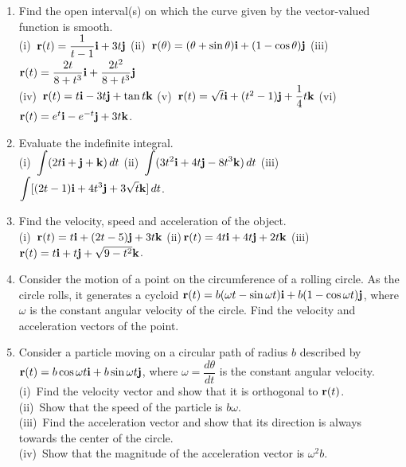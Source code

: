 \documentclass[titlepage,a4paper,12pt]{report}
\begin{document}
\begin{enumerate}
\quad (i)\,$D_t[{\bf{r}}(t)\pm {\bf{u}}(t)]={\bf{r}}'(t) \pm {\bf{u}}'(t)$, \quad (ii)\,$D_t[{\bf{r}}(t)\cdot {\bf{u}}(t)]={\bf{r}}(t) \cdot {\bf{u}}'(t)+{\bf{r}}'(t)\cdot {\bf{u}}(t)$, \\
\quad (iii)\, If ${\bf{r}}(t)\cdot {\bf{r}}(t)=c$, then ${\bf{r}}(t)\cdot {\bf{r}}'(t)=0$.
\item Find the open interval(s) on which the curve given by the vector-valued function is smooth.\\
(i)\, ${\bf{r}}(t)=\dfrac{1}{t-1}{\bf{i}}+3t{\bf{j}}$ \quad (ii)\, ${\bf{r}}(\theta)=(\theta +\sin \theta){\bf{i}}+(1-\cos \theta){\bf{j}}$ \quad (iii)\, ${\bf{r}}(t)=\dfrac{2t}{8+t^3}{\bf{i}}+\dfrac{2t^2}{8+t^3}{\bf{j}}$\\
(iv)\, ${\bf{r}}(t)=t{\bf{i}}-3t{\bf{j}}+\tan t {\bf{k}}$ \quad (v)\, ${\bf{r}}(t)=\sqrt{t}{{\bf{i}}}+(t^2-1){\bf{j}}+\dfrac{1}{4}t{\bf{k}}$ \quad (vi)\, ${\bf{r}}(t)=e^t{\bf{i}}-e^{-t}{\bf{j}}+3t{\bf{k}}$.
\item Evaluate the indefinite integral.\\
(i)\, $\displaystyle \int (2t{\bf{i}}+{\bf{j}}+{\bf{k}})\, dt$ \quad (ii)\, $\displaystyle \int (3t^2{\bf{i}}+4t{\bf{j}}-8t^3{\bf{k}})\, dt $ \quad (iii)\, $\displaystyle \int [(2t-1){\bf{i}}+4t^3{\bf{j}}+3\sqrt{t}{\bf{k}}]\, dt$.
\item Find the velocity, speed and acceleration of the object.\\
(i)\, ${\bf{r}}(t)=t{\bf{i}}+(2t-5){\bf{j}}+3t{\bf{k}}$ \quad (ii)\,${\bf{r}}(t)=4t{\bf{i}}+4t{\bf{j}}+2t{\bf{k}}$  \quad (iii)\, ${\bf{r}}(t)=t{\bf{i}}+t{\bf{j}}+\sqrt{9-t^2}{\bf{k}}$.
\item Consider the motion of a point on the circumference of a rolling circle. As the circle rolls, it generates a cycloid ${\bf{r}}(t)=b(\omega t-\sin \omega t){\bf{i}}+b(1-\cos \omega t){\bf{j}}$, where $\omega$ is the constant angular velocity of the circle. Find the velocity and acceleration vectors of the point.
\item Consider a particle moving on a circular path of radius $b$ described by ${\bf{r}}(t)=b\cos \omega t {\bf{i}}+b\sin \omega t{\bf{j}}$, where $\omega=\dfrac{d\theta}{dt}$ is the constant angular velocity. \\
(i)\, Find the velocity vector and show that it is orthogonal to ${\bf{r}}(t)$.\\
(ii)\, Show that the speed of the particle is $b\omega$.\\
(iii)\, Find the acceleration vector and show that its direction is always towards the center of the circle.\\
(iv)\, Show that the magnitude of the acceleration vector is $\omega ^2 b$.
\end{enumerate}
\end{document}
